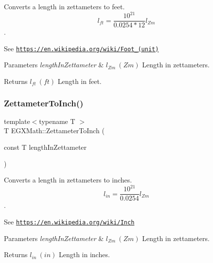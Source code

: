Converts a length in zettameters to feet. \[ l_{ft}= \frac{10^{21}}{0.0254 * 12} l_{Zm} \]. 

See \href{https://en.wikipedia.org/wiki/Foot_(unit)}{\tt https\+://en.\+wikipedia.\+org/wiki/\+Foot\+\_\+(unit)} 
\begin{DoxyParams}{Parameters}
{\em length\+In\+Zettameter} & $ l_{Zm}\ (Zm)$ Length in zettameters. \\
\hline
\end{DoxyParams}
\begin{DoxyReturn}{Returns}
$ l_{ft}\ (ft)$ Length in feet. 
\end{DoxyReturn}
\mbox{\label{group___e_g_x_math-_conversions-_length_conversions-_s_i-_zettameter-_imperial_gada0a88ddbf198ca1828b6c39fda34f2c}} 
\subsubsection{\texorpdfstring{Zettameter\+To\+Inch()}{ZettameterToInch()}}
{\footnotesize\ttfamily template$<$typename T $>$ \\
T E\+G\+X\+Math\+::\+Zettameter\+To\+Inch (\begin{DoxyParamCaption}\item[{const T}]{length\+In\+Zettameter }\end{DoxyParamCaption})}



Converts a length in zettameters to inches. \[ l_{in}= \frac{10^{21}}{0.0254} l_{Zm} \]. 

See \href{https://en.wikipedia.org/wiki/Inch}{\tt https\+://en.\+wikipedia.\+org/wiki/\+Inch} 
\begin{DoxyParams}{Parameters}
{\em length\+In\+Zettameter} & $ l_{Zm}\ (Zm)$ Length in zettameters. \\
\hline
\end{DoxyParams}
\begin{DoxyReturn}{Returns}
$ l_{in}\ (in)$ Length in inches. 
\end{DoxyReturn}
\mbox{\label{group___e_g_x_math-_conversions-_length_conversions-_s_i-_zettameter-_imperial_gad42b99391f53e56136f2411915c5e28d}} 
